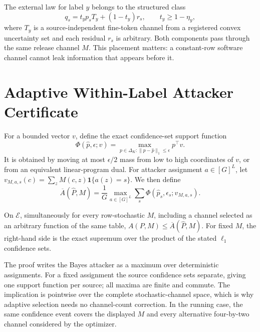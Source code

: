 The external law for label $y$ belongs to the structured class
\begin{equation}
 q_s=t_y p_sT_y+(1-t_y)r_s,
 \qquad t_y\geq 1-\eta_y,
 \label{eq:shift}
\end{equation}
where $T_y$ is a source-independent fine-token channel from a registered
convex uncertainty set and each residual $r_s$ is arbitrary. Both components
pass through the same release channel $M$. This placement matters: a
constant-row software channel cannot leak information that appears before it.

\section{Adaptive Within-Label Attacker Certificate}

For a bounded vector $v$, define the exact confidence-set support function
\begin{equation}
 \Phi(\widehat p,\epsilon;v)=
 \max_{p\in\Delta_K:\|p-\widehat p\|_1\leq\epsilon}p^\top v.
 \label{eq:phi}
\end{equation}
It is obtained by moving at most $\epsilon/2$ mass from low to high
coordinates of $v$, or from an equivalent linear-program dual. For attacker
assignment $a\in[G]^L$, let
$v_{M,a,s}(c)=\sum_zM(c,z)\mathbf 1\{a(z)=s\}$. We then define
\begin{equation}
 \overline A(\widehat P,M)=\frac{1}{G}\max_{a\in[G]^L}
 \sum_s\Phi(\widehat p_s,\epsilon_s;v_{M,a,s}).
 \label{eq:abar}
\end{equation}

\begin{theorem}
On $\mathcal E$, simultaneously for every row-stochastic $M$, including a
channel selected as an arbitrary function of the same table,
$A(P,M)\leq\overline A(\widehat P,M)$. For fixed $M$, the right-hand side is the
exact supremum over the product of the stated $\ell_1$ confidence sets.
\end{theorem}

The proof writes the Bayes attacker as a maximum over deterministic assignments.
For a fixed assignment the source confidence sets separate, giving one support
function per source; all maxima are finite and commute. The implication is
pointwise over the complete stochastic-channel space, which is why adaptive
selection needs no channel-count correction. In the running case, the same
confidence event covers the displayed $M$ and every alternative four-by-two
channel considered by the optimizer.

